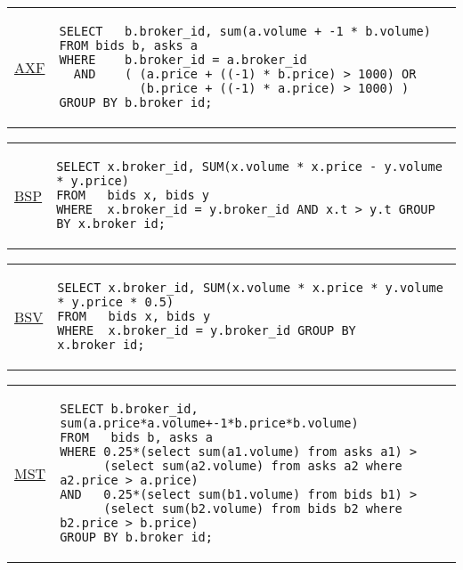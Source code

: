 \hspace{-5mm}\vspace{-8mm}
\begin{tabular}{lp{}}
\begin{rotate}{90}\hspace{-1cm}\underline{AXF}\end{rotate} &
{\scriptsize
\begin{verbatim}
SELECT   b.broker_id, sum(a.volume + -1 * b.volume) FROM bids b, asks a
WHERE    b.broker_id = a.broker_id
  AND    ( (a.price + ((-1) * b.price) > 1000) OR
           (b.price + ((-1) * a.price) > 1000) )
GROUP BY b.broker_id;
\end{verbatim}
}
\end{tabular}

\hspace{-5mm}\vspace{-8mm}
\begin{tabular}{lp{}}
\begin{rotate}{90}\hspace{-1cm}\underline{BSP}\end{rotate} &
{\scriptsize
\begin{verbatim}
SELECT x.broker_id, SUM(x.volume * x.price - y.volume * y.price)
FROM   bids x, bids y
WHERE  x.broker_id = y.broker_id AND x.t > y.t GROUP BY x.broker_id;
\end{verbatim}
}
\end{tabular}

\hspace{-5mm}\vspace{-8mm}
\begin{tabular}{lp{}}
\begin{rotate}{90}\hspace{-1cm}\underline{BSV}\end{rotate} &
{\scriptsize
\begin{verbatim}
SELECT x.broker_id, SUM(x.volume * x.price * y.volume * y.price * 0.5)
FROM   bids x, bids y
WHERE  x.broker_id = y.broker_id GROUP BY x.broker_id;
\end{verbatim}
}
\end{tabular}

\hspace{-5mm}\vspace{-8mm}
\begin{tabular}{lp{}}
\begin{rotate}{90}\hspace{-1cm}\underline{MST}\end{rotate} &
{\scriptsize
\begin{verbatim}
SELECT b.broker_id, sum(a.price*a.volume+-1*b.price*b.volume)
FROM   bids b, asks a
WHERE 0.25*(select sum(a1.volume) from asks a1) >
      (select sum(a2.volume) from asks a2 where a2.price > a.price)
AND   0.25*(select sum(b1.volume) from bids b1) >
      (select sum(b2.volume) from bids b2 where b2.price > b.price)
GROUP BY b.broker_id;
\end{verbatim}
}
\end{tabular}

